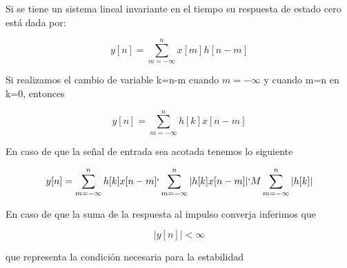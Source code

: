 Si se tiene un sistema lineal invariante en el tiempo su respuesta de estado cero está dada por:

\begin{equation}
y[n]=\sum_{m=-\infty}^n x[m]h[n-m]
\end{equation}

Si realizamos el cambio de variable k=n-m cuando $m=-\infty$ y cuando m=n en k=0, entonces

\begin{equation}
y[n]=\sum_{m=-\infty}^n h[k]x[n-m]
\end{equation}

En caso de que la señal de entrada sea acotada tenemos lo siguiente

\begin{equation}
y[n]=\sum_{m=-\infty}^n h[k]x[n-m] \lq \sum_{m=-\infty}^n |h[k]x[n-m]| \lq M\sum_{m=-\infty}^n |h[k]|
\end{equation}

En caso de que la suma de la respuesta al impulso converja inferimos que 

\begin{equation}
|y[n]|<\infty
\end{equation}

que representa la condición necesaria para la estabilidad
